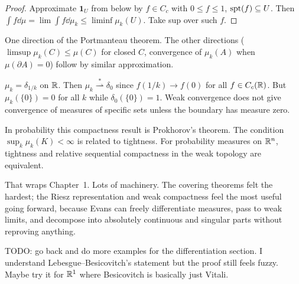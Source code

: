 \begin{proof}
Approximate $\mathbf{1}_U$ from below by $f \in C_c$ with $0 \le f \le 1$,
$\operatorname{spt}(f) \subseteq U$. Then
$\int f \dd\mu = \lim \int f \dd\mu_k \le \liminf \mu_k(U)$. Take sup
over such $f$. \qedhere
\end{proof}

One direction of the Portmanteau theorem. The other directions ($\limsup \mu_k(C) \le \mu(C)$ for closed $C$, convergence of $\mu_k(A)$ when
$\mu(\partial A) = 0$) follow by similar approximation.

\begin{example}\label{ex:weak-not-strong}
$\mu_k = \delta_{1/k}$ on $\mathbb{R}$. Then
$\mu_k \stackrel{*}{\rightharpoonup} \delta_0$ since $f(1/k) \to f(0)$
for all $f \in C_c(\mathbb{R})$. But $\mu_k(\{0\}) = 0$ for all $k$ while
$\delta_0(\{0\}) = 1$. Weak convergence does not give convergence of
measures of specific sets unless the boundary has measure zero.
\end{example}

\begin{remark}\label{rem:prokhorov}
In probability this compactness result is Prokhorov's theorem.
The condition $\sup_k \mu_k(K) < \infty$ is related to tightness. For
probability measures on $\mathbb{R}^n$, tightness and relative sequential
compactness in the weak topology are equivalent.
\end{remark}

\bigskip

That wraps Chapter~1. Lots of machinery. The covering theorems felt the hardest; the Riesz representation
and weak compactness feel the most useful going forward, because Evans can freely differentiate measures, pass to weak limits, and
decompose into absolutely continuous and singular parts without reproving anything.

TODO: go back and do more examples for the differentiation section. I
understand Lebesgue--Besicovitch's statement but the proof still feels
fuzzy. Maybe try it for $\mathbb{R}^1$ where Besicovitch is basically just Vitali.

